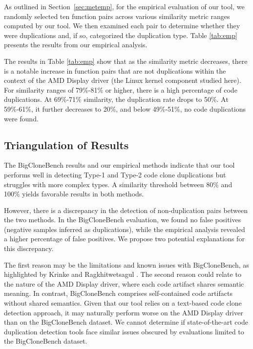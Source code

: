 As outlined in Section~\ref{sec:metemp}, for the empirical evaluation of our tool, we randomly selected ten function pairs across various similarity metric ranges computed by our tool. We then examined each pair to determine whether they were duplications and, if so, categorized the duplication type. Table \ref{tab:emp} presents the results from our empirical analysis.



The results in Table \ref{tab:emp} show that as the similarity metric decreases, 
there is a notable increase in function pairs that are not duplications within 
the context of the AMD Display driver (the Linux kernel component studied here). 
For similarity ranges of 79\%-81\% or higher, there is a high 
percentage of code duplications. At 69\%-71\% similarity, the duplication rate 
drops to 50\%. At 59\%-61\%, it further decreases to 20\%, and below 49\%-51\%, 
no code duplications were found.

\subsection{Triangulation of Results}

The BigCloneBench results and our empirical methods indicate that our tool performs well in detecting Type-1 and Type-2 code clone duplications but struggles with more complex types. A similarity threshold between 80\% and 100\% yields favorable results in both methods.

However, there is a discrepancy in the detection of non-duplication pairs between the two methods. In the BigCloneBench evaluation, we found no false positives (negative samples inferred as duplications), while the empirical analysis revealed a higher percentage of false positives. We propose two potential explanations for this discrepancy.

The first reason may be the limitations and known issues with BigCloneBench, as highlighted by Krinke and Ragkhitwetsagul \citep{bigfail}. The second reason could relate to the nature of the AMD Display driver, where each code artifact shares semantic meaning. In contrast, BigCloneBench comprises self-contained code artifacts without shared semantics. Given that our tool relies on a text-based code clone detection approach, it may naturally perform worse on the AMD Display driver than on the BigCloneBench dataset. We cannot determine if state-of-the-art code duplication detection tools face similar issues obscured by evaluations limited to the BigCloneBench dataset.
